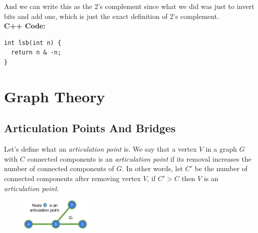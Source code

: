 \documentclass[twoside]{article}
\newcommand{\fileTitleStyle}{\centering\underline}
\begin{document}
And we can write this as the 2's complement since what we did was just to invert bits and add one, which is just the exact definition of 2's complement.\\

\textbf{C++ Code:}\\
\begin{verbatim}
int lsb(int n) {
  return n & -n;
}
\end{verbatim}


\egroup
\vspace{1em}
\begin{multicols*}{2}
\end{multicols*}
\newpage
\sectionfont{\centering\bfseries\Huge}
\vspace{1em}
\section*{Graph Theory}
\vspace{3em}
\subsectionfont{\bfseries\LARGE}
\subsectionfont{\fileTitleStyle}
\subsection*{Articulation Points And Bridges}
\vspace*{2em}
Let's define what an \textit{articulation point} is. We say that a vertex $V$ in a graph $G$ with $C$
connected components is an \textit{articulation point} if its removal increases the number of connected components of $G$.
In other words, let $C'$ be the number of connected components after removing vertex $V$, if $C' > C$ then $V$ is an \textit{articulation point}.

\begin{figure}[H]
  \centering
  \includegraphics[width=0.3\textwidth]{"Images/Graph Theory/Articulation Points And Bridges/1.png"}
\end{figure}
\end{document}
